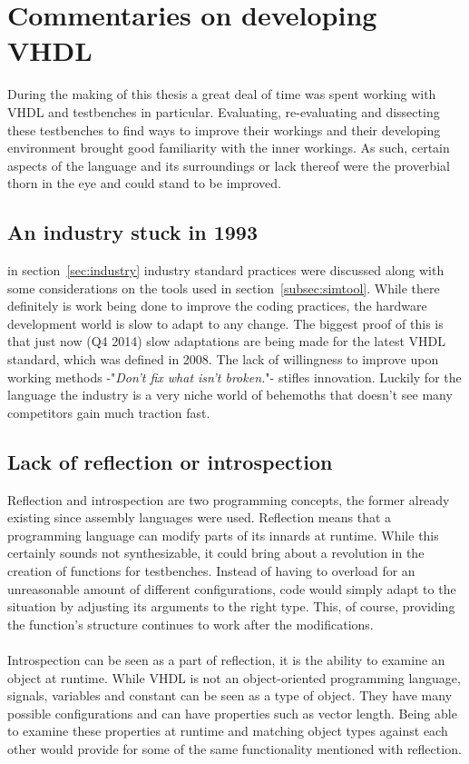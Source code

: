 \documentclass[11pt,british]{article}
\begin{document}
\newpage{}
\section{Commentaries on developing VHDL}
During the making of this thesis a great deal of time was spent working with \gls{VHDL} and testbenches in particular. Evaluating, re-evaluating and dissecting these testbenches to find ways to improve their workings and their developing environment brought good familiarity with the inner workings. As such, certain aspects of the language and its surroundings or lack thereof were the proverbial thorn in the eye and could stand to be improved.

\subsection{An industry stuck in 1993}
\label{subsec:stuck}
in section~\ref{sec:industry} industry standard practices were discussed along with some considerations on the tools used in section~\ref{subsec:simtool}. While there definitely is work being done to improve the coding practices, the hardware development world is slow to adapt to any change. The biggest proof of this is that just now (Q4 2014) slow adaptations are being made for the latest VHDL standard, which was defined in 2008. The lack of willingness to improve upon working methods -"\emph{Don't fix what isn't broken.}"- stifles innovation. Luckily for the language the industry is a very niche world of behemoths that doesn't see many competitors gain much traction fast.

\subsection{Lack of reflection or introspection}
Reflection and introspection are two programming concepts, the former already existing since assembly languages were used. Reflection means that a programming language can modify parts of its innards at runtime. While this certainly sounds not synthesizable, it could bring about a revolution in the creation of functions for testbenches. Instead of having to overload for an unreasonable amount of different configurations, code would simply adapt to the situation by adjusting its arguments to the right type. This, of course, providing the function's structure  continues to work after the modifications.
\\
\\
Introspection can be seen as a part of reflection, it is the ability to examine an object at runtime. While VHDL is not an object-oriented programming language, signals, variables and constant can be seen as a type of object. They have many possible configurations and can have  properties such as vector length. Being able to examine these properties at runtime and matching object types against each other would provide for some of the same functionality mentioned with reflection.
\end{document}
